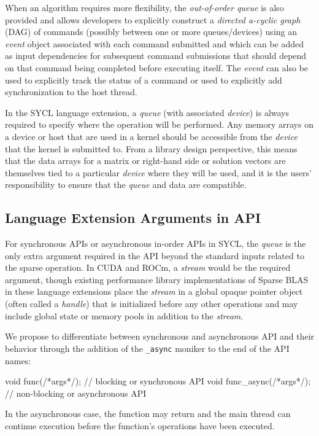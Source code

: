 \documentclass{article}
\begin{document}
When an algorithm requires more flexibility, the \textit{out-of-order queue} is also provided and allows developers to explicitly construct a \textit{directed a-cyclic graph} (DAG) of commands (possibly between one or more queues/devices) using an \textit{event} object associated with each command submitted and which can be added as input dependencies for subsequent command submissions that should depend on that command being completed before executing itself.  The \textit{event} can also be used to explicitly track the status of a command or used to explicitly add synchronization to the host thread. 

In the SYCL language extension, a \textit{queue} (with associated \textit{device}) is always required to specify where the operation will be performed. Any memory arrays on a device or host that are used in a kernel should be accessible from the \textit{device} that the kernel is submitted to. From a library design perspective, this means that the data arrays for a matrix or right-hand side or solution vectors are themselves tied to a particular \textit{device} where they will be used, and it is the users' responsibility to ensure that the \textit{queue} and data are compatible. 

\subsection{Language Extension Arguments in API}

For synchronous APIs or asynchronous in-order APIs in SYCL, the \textit{queue} is the only extra argument required in the API beyond the standard inputs related to the sparse operation.  In CUDA and ROCm, a \textit{stream} would be the required argument, though existing performance library implementations of Sparse BLAS in these language extensions place the \textit{stream} in a global opaque pointer object (often called a \textit{handle}) that is initialized before any other operations and may include global state or memory pools in addition to the \textit{stream}.

We propose to differentiate between synchronous and asynchronous API and their behavior through the addition of the \verb|_async| moniker to the end of the API names:
\begin{lstlistings}
void func(/*args*/);       // blocking or synchronous API
void func_async(/*args*/); // non-blocking or asynchronous API
\end{lstlistings}
In the asynchronous case, the function may return and the main thread can continue execution before the function's operations have been executed. 
\end{document}

